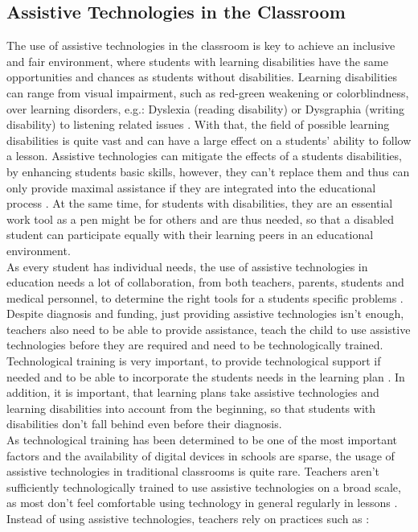 \documentclass{Academic}
\begin{document}
    \subsection{Assistive Technologies in the Classroom}
    The use of assistive technologies in the classroom is key to achieve an inclusive and fair environment, where students with learning disabilities have the same opportunities and chances as students without disabilities. Learning disabilities can range from visual impairment, such as red-green weakening or colorblindness, over learning disorders, e.g.: Dyslexia (reading disability) or Dysgraphia (writing disability) to listening related issues \cite{adebisi_using_2015}. With that, the field of possible learning disabilities is quite vast and can have a large effect on a students' ability to follow a lesson. Assistive technologies can mitigate the effects of a students disabilities, by enhancing students basic skills, however, they can't replace them and thus can only provide maximal assistance if they are integrated into the educational process \cite{adebisi_using_2015}. At the same time, for students with disabilities, they are an essential work tool as a pen might be for others and are thus needed, so that a disabled student can participate equally with their learning peers in an educational environment. \\
    As every student has individual needs, the use of assistive technologies in education needs a lot of collaboration, from both teachers, parents, students and medical personnel, to determine the right tools for a students specific problems \cite{adebisi_using_2015}. Despite diagnosis and funding, just providing assistive technologies isn't enough, teachers also need to be able to provide assistance, teach the child to use assistive technologies before they are required and need to be technologically trained. Technological training is very important, to provide technological support if needed and to be able to incorporate the students needs in the learning plan \cite{adebisi_using_2015}. In addition, it is important, that learning plans take assistive technologies and learning disabilities into account from the beginning, so that students with disabilities don't fall behind even before their diagnosis. \\
    As technological training has been determined to be one of the most important factors and the availability of digital devices in schools are sparse, the usage of assistive technologies in traditional classrooms is quite rare. Teachers aren't sufficiently technologically trained to use assistive technologies on a broad scale, as most don't feel comfortable using technology in general regularly in lessons \cite{noauthor_icils_nodate}. Instead of using assistive technologies, teachers rely on practices such as \cite{teaching_learning_dissabilities}:
\end{document}
